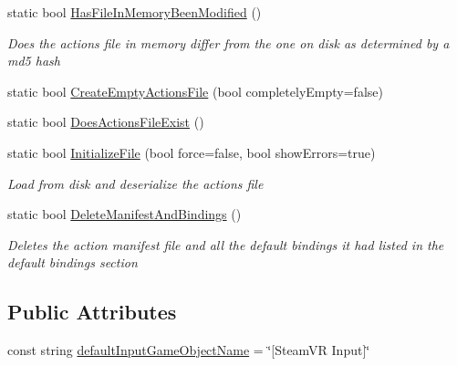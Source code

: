 \begin{DoxyCompactItemize}
static bool \mbox{\hyperlink{class_valve_1_1_v_r_1_1_steam_v_r___input_a7dcd55f6d1d832f6bff18860868d70ba}{Has\+File\+In\+Memory\+Been\+Modified}} ()
\begin{DoxyCompactList}\small\item\em Does the actions file in memory differ from the one on disk as determined by a md5 hash \end{DoxyCompactList}\item 
static bool \mbox{\hyperlink{class_valve_1_1_v_r_1_1_steam_v_r___input_a8926553c62a1d68cdd22f78cbe03a2e2}{Create\+Empty\+Actions\+File}} (bool completely\+Empty=false)
\item 
static bool \mbox{\hyperlink{class_valve_1_1_v_r_1_1_steam_v_r___input_a8ec782e1242f6f3179c4f361f4604db6}{Does\+Actions\+File\+Exist}} ()
\item 
static bool \mbox{\hyperlink{class_valve_1_1_v_r_1_1_steam_v_r___input_a45c0fb7aca33a1e2db7c4f5730ac8189}{Initialize\+File}} (bool force=false, bool show\+Errors=true)
\begin{DoxyCompactList}\small\item\em Load from disk and deserialize the actions file \end{DoxyCompactList}\item 
static bool \mbox{\hyperlink{class_valve_1_1_v_r_1_1_steam_v_r___input_a8f968e5a31e70c560ee75b6f7734ca47}{Delete\+Manifest\+And\+Bindings}} ()
\begin{DoxyCompactList}\small\item\em Deletes the action manifest file and all the default bindings it had listed in the default bindings section \end{DoxyCompactList}\end{DoxyCompactItemize}
\subsection*{Public Attributes}
\begin{DoxyCompactItemize}
\item 
const string \mbox{\hyperlink{class_valve_1_1_v_r_1_1_steam_v_r___input_aae772d64b091f820acca71586e36e623}{default\+Input\+Game\+Object\+Name}} = \char`\"{}\mbox{[}Steam\+VR Input\mbox{]}\char`\"{}
\end{DoxyCompactItemize}
